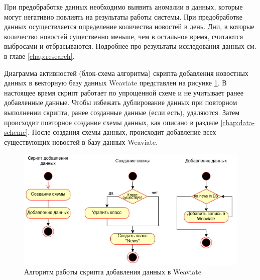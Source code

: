 При предобработке данных необходимо выявить аномалии в данных, которые могут негативно повлиять на результаты работы системы. При предобработке данных осуществляется определение количества новостей в день. Дни, в которые количество новостей существенно меньше, чем в остальное время, считаются выбросами и отбрасываются. Подробнее про результаты исследования данных см. в главе \ref{chap:research}.

Диаграмма активностей (блок-схема алгоритма) скрипта добавления новостных данных в векторную базу данных Weaviate представлен на рисунке \ref{img:add-script}. В настоящее время скрипт работает по упрощенной схеме и не учитывает ранее добавленные данные. Чтобы избежать дублирование данных при повторном выполнении скрипта, ранее созданные данные (если есть), удаляются. Затем происходит повторное создание схемы данных, как описано в разделе \ref{chap:data-scheme}. После создания схемы данных, происходит добавление всех существующих новостей в базу данных Weaviate.

\begin{figure}[h]
    \centering
    \includegraphics{images/add-script.png}
    \caption{Алгоритм работы скрипта добавления данных в Weaviate}
    \label{img:add-script}
\end{figure}
